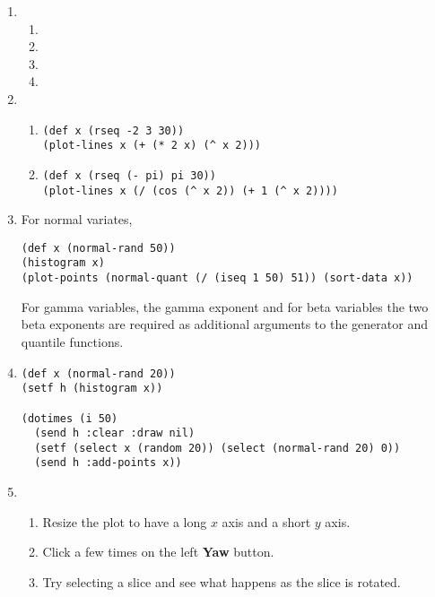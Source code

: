 \newpage
{}
\begin{enumerate}
\item
\begin{enumerate}
\item {}
\item {}
\item {}
\item {}
\end{enumerate}

\item
\begin{enumerate}
\item
\begin{verbatim}
(def x (rseq -2 3 30))
(plot-lines x (+ (* 2 x) (^ x 2)))
\end{verbatim}
\item
\begin{verbatim}
(def x (rseq (- pi) pi 30))
(plot-lines x (/ (cos (^ x 2)) (+ 1 (^ x 2))))
\end{verbatim}
\end{enumerate}

\item
For normal variates,
\begin{verbatim}
(def x (normal-rand 50))
(histogram x)
(plot-points (normal-quant (/ (iseq 1 50) 51)) (sort-data x))
\end{verbatim}
For gamma variables, the gamma exponent and for beta variables the two
beta exponents are required as additional arguments to the generator
and quantile functions.

\item
\begin{verbatim}
(def x (normal-rand 20))
(setf h (histogram x))

(dotimes (i 50)
  (send h :clear :draw nil)
  (setf (select x (random 20)) (select (normal-rand 20) 0))
  (send h :add-points x))
\end{verbatim}

\item
\begin{enumerate}
\item
Resize the plot to have a long $x$ axis and a short $y$ axis.
\item
Click a few times on the left {\bf Yaw} button.
\item
Try selecting a slice and see what happens as the slice is rotated.
\end{enumerate}
\end{enumerate}

